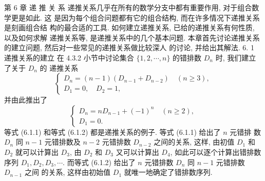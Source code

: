 \documentclass{report}
\begin{document}
	第 6 章 递 推 关 系
	递推关系几乎在所有的数学分支中都有重要作用, 对于组合数学更是如此. 这 是因为每个组合问题都有它的组合结构, 而在许多情况下递推关系是刻画组合结 构的最合适的工具. 如何建立递推关系, 已给的递推关系有何性质, 以及如何求解 递推关系等, 是递推关系中的几个基本问题.
	本章首先讨论递推关系的建立问题, 然后对一些常见的递推关系做比较深人 的讨论, 并给出其解法.
	6. 1 递推关系的建立
	在 4.3.2 小节中讨论集合 $\{1,2, \cdots, n\}$ 的错排数 $D_n$ 时, 我们建立了关于 $D_n$ 的 递推关系
	$$
	\left\{\begin{array}{l}
	D_n=(n-1)\left(D_{n-1}+D_{n-2}\right) \quad(n \geqslant 3), \\
	D_1=0, \quad D_2=1,
	\end{array}\right.
	$$
	并由此推出了
	$$
	\left\{\begin{array}{l}
	D_n=n D_{n-1}+(-1)^n \quad(n \geqslant 2), \\
	D_1=0 .
	\end{array}\right.
	$$
	等式 (6.1.1) 和等式 (6.1.2) 都是递推关系的例子. 等式 (6.1.1) 给出了 $n$ 元错排 数 $D_n$ 同 $n-1$ 元错排数及 $n-2$ 元错排数 $D_{n-2}$ 之间的关系, 这样, 由初值 $D_1$ 和 $D_2$ 就可以计算出 $D_3$, 由 $D_2$ 和 $D_3$ 又可以计算出 $D_4$, 如此可以逐个计算出错排数序列 $D_1, D_2, D_3, \cdots$. 而等式 (6.1.2) 给出了 $n$ 元错排数 $D_n$ 同 $n-1$ 元错排数 $D_{n-1}$ 之间 的关系, 这样由初始值 $D_1$ 就唯一地确定了错排数序列.
	
\end{document}
